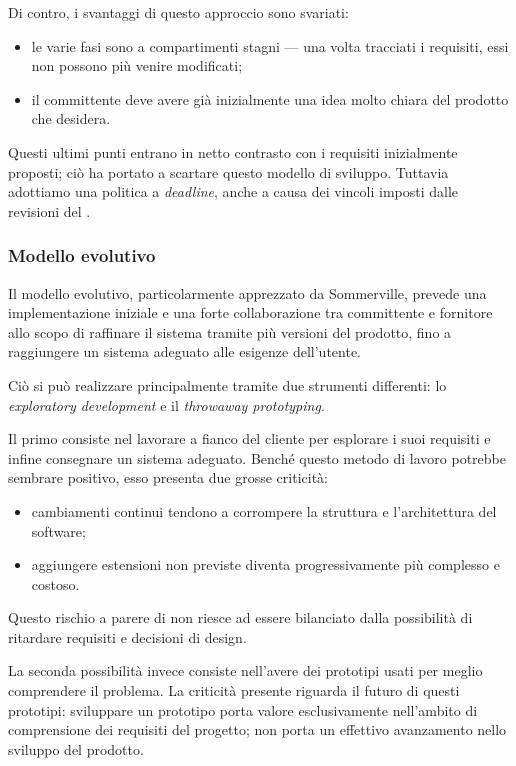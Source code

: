 Di contro, i svantaggi di questo approccio sono svariati:
\begin{itemize}
	\item le varie fasi sono a compartimenti stagni --- una volta tracciati i requisiti, essi non possono più venire modificati;
	\item il committente deve avere già inizialmente una idea molto chiara del prodotto che desidera.
\end{itemize}
Questi ultimi punti entrano in netto contrasto con i requisiti inizialmente proposti; ciò ha portato a scartare questo modello di sviluppo. Tuttavia adottiamo una politica a \emph{deadline}, anche a causa dei vincoli imposti dalle revisioni del \TV.

\subsubsection{Modello evolutivo}
Il modello evolutivo, particolarmente apprezzato da Sommerville, prevede una implementazione iniziale e una forte collaborazione tra committente e fornitore allo scopo di raffinare il sistema tramite più versioni del prodotto, fino a raggiungere un sistema adeguato alle esigenze dell'utente.

Ciò si può realizzare principalmente tramite due strumenti differenti: lo \emph{exploratory development} e il \emph{throwaway prototyping}.

Il primo consiste nel lavorare a fianco del cliente per esplorare i suoi requisiti e infine consegnare un sistema adeguato. Benché questo metodo di lavoro potrebbe sembrare positivo, esso presenta due grosse criticità: 
\begin{itemize}
	\item cambiamenti continui tendono a corrompere la struttura e l'architettura del software;
	\item aggiungere estensioni non previste diventa progressivamente più complesso e costoso. 
\end{itemize}
Questo rischio a parere di \hx{} non riesce ad essere bilanciato dalla possibilità di ritardare requisiti e decisioni di design.

La seconda possibilità invece consiste nell'avere dei prototipi usati per meglio comprendere il problema. La criticità presente riguarda il futuro di questi prototipi: sviluppare un prototipo porta valore esclusivamente nell'ambito di comprensione dei requisiti del progetto; non porta un effettivo avanzamento nello sviluppo del prodotto.

